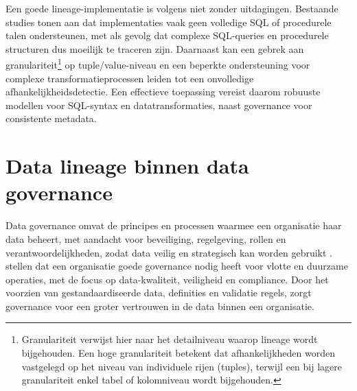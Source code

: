 Een goede lineage-implementatie is volgens \textcite{tang2022modeling} niet zonder uitdagingen. Bestaande studies tonen aan dat implementaties vaak geen volledige SQL of procedurele talen ondersteunen, met als gevolg dat complexe SQL-queries en procedurele structuren dus moeilijk te traceren zijn. Daarnaast kan een gebrek aan granulariteit\footnote{Granulariteit verwijst hier naar het detailniveau waarop lineage wordt bijgehouden. Een hoge granulariteit betekent dat afhankelijkheden worden vastgelegd op het niveau van individuele rijen (tuples), terwijl een bij lagere granulariteit enkel tabel of kolomniveau wordt bijgehouden.} op tuple/value-niveau en een beperkte ondersteuning voor complexe transformatie\-processen leiden tot een onvolledige afhankelijk\-heids\-detectie. Een effectieve toepassing vereist daarom robuuste modellen voor SQL-syntax en datatransformaties, naast governance voor consistente metadata.\\

\section{Data lineage binnen data governance}

Data governance omvat de principes en processen waarmee een organisatie haar data beheert, met aandacht voor beveiliging, regelgeving, rollen en verantwoordelijkheden, zodat data veilig en strategisch kan worden gebruikt \autocite{verma2024tracing}. \textcite{verma2024tracing} stellen dat een organisatie goede governance nodig heeft voor vlotte en duurzame operaties, met de focus op data-kwaliteit, veiligheid en compliance. Door het voorzien van gestandaardiseerde data, definities en validatie regels, zorgt governance voor een groter vertrouwen in de data binnen een organisatie.\\

